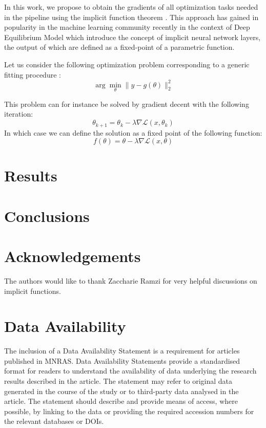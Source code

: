\documentclass[fleqn,usenatbib]{mnras}
\begin{document}
In this work, we propose to obtain the gradients of all optimization tasks needed in the pipeline using the implicit function theorem \citep{Kranz2002}. This approach has gained in popularity in the machine learning community recently in the context of Deep Equilibrium Model which introduce the concept of implicit neural network layers, the output of which are defined as a fixed-point of a parametric function.

Let us consider the following optimization problem corresponding to a generic fitting procedure :
\begin{equation}
	\arg \min_{\theta} \parallel y - g(\theta) \parallel_2^2 
\end{equation}

This problem can for instance be solved by gradient decent with the following iteration:
\begin{equation}
	\theta_{k+1} = \theta_{k} - \lambda \nabla \mathcal{L}(x, \theta_k)
\end{equation}
In which case we can define the solution as a fixed point of the following function:
\begin{equation}
	f(\theta) = \theta -  \lambda \nabla \mathcal{L}(x, \theta)
\end{equation}
 


\section{Results}

\section{Conclusions}

\section*{Acknowledgements}

The authors would like to thank Zaccharie Ramzi for very helpful discussions on
implicit functions. 


\section*{Data Availability}

 
The inclusion of a Data Availability Statement is a requirement for articles published in MNRAS. Data Availability Statements provide a standardised format for readers to understand the availability of data underlying the research results described in the article. The statement may refer to original data generated in the course of the study or to third-party data analysed in the article. The statement should describe and provide means of access, where possible, by linking to the data or providing the required accession numbers for the relevant databases or DOIs.
\end{document}
